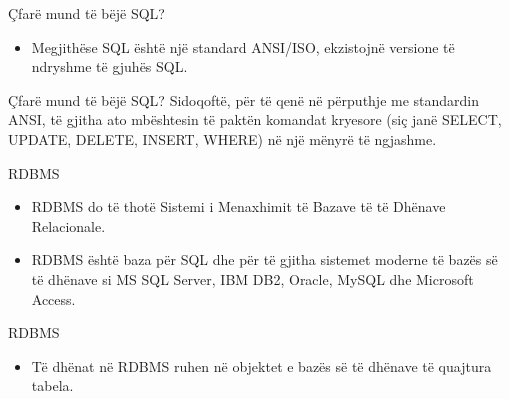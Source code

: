 \documentclass[
  ignorenonframetext,
]{beamer}
\providecommand{\tightlist}{%
  \setlength{\itemsep}{0pt}\setlength{\parskip}{0pt}}
\begin{document}
\begin{frame}{Çfarë mund të bëjë SQL?}
\label{uxe7faruxeb-mund-tuxeb-buxebjuxeb-sql-3}
\begin{itemize}
\tightlist
\item
  Megjithëse SQL është një standard ANSI/ISO, ekzistojnë versione të
  ndryshme të gjuhës SQL.
\end{itemize}
\end{frame}

\begin{frame}{Çfarë mund të bëjë SQL?}
\label{uxe7faruxeb-mund-tuxeb-buxebjuxeb-sql-4}
Sidoqoftë, për të qenë në përputhje me standardin ANSI, të gjitha ato
mbështesin të paktën komandat kryesore (siç janë SELECT, UPDATE, DELETE,
INSERT, WHERE) në një mënyrë të ngjashme.
\end{frame}

\begin{frame}{RDBMS}
\label{rdbms}
\begin{itemize}
\item
  RDBMS do të thotë Sistemi i Menaxhimit të Bazave të të Dhënave
  Relacionale.
\item
  RDBMS është baza për SQL dhe për të gjitha sistemet moderne të bazës
  së të dhënave si MS SQL Server, IBM DB2, Oracle, MySQL dhe Microsoft
  Access.
\end{itemize}
\end{frame}

\begin{frame}{RDBMS}
\label{rdbms-1}
\begin{itemize}
\tightlist
\item
  Të dhënat në RDBMS ruhen në objektet e bazës së të dhënave të quajtura
  tabela.
\end{itemize}
\end{frame}
\end{document}
